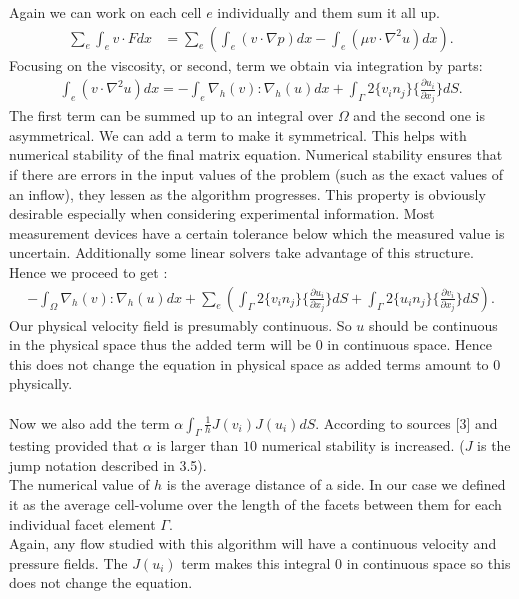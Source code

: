 \documentclass[11pt,twoside,a4paper]{article}
\begin{document}
Again we can work on each cell $e$ individually and them sum it all up.
\begin{align*}
\sum_e \int_e v \cdot F dx &= \sum_e (\int_e (v \cdot \nabla p) dx - \int_e (\mu v \cdot \nabla^2 u) dx) .
\end{align*}
Focusing on the viscosity, or second, term we obtain via integration by parts:
\begin{align*}
\int_e (v \cdot \nabla^2 u) dx = - \int_e \nabla_h(v) : \nabla_h(u) dx + \int_\Gamma 2 \{ v_i n_j \} \{ \frac{\partial u_i}{\partial x_j}\} dS .
\end{align*}
The first term can be summed up to an integral over $\Omega$ and the second one is asymmetrical. We can add a term to make it symmetrical. This helps with numerical stability of the final matrix equation. Numerical stability ensures that if there are errors in the input values of the problem (such as the exact values of an inflow), they lessen as the algorithm progresses. This property is obviously desirable especially when considering experimental information. Most measurement devices have a certain tolerance below which the measured value is uncertain. Additionally some linear solvers take advantage of this structure.\\
Hence we proceed to get :
\begin{align*}
-  \int_\Omega \nabla_h(v) : \nabla_h(u) dx + \sum_e( \int_\Gamma 2 \{ v_i n_j \} \{ \frac{\partial u_i}{\partial x_j}\} dS + \int_\Gamma 2 \{ u_i n_j \} \{ \frac{\partial v_i}{\partial x_j}\} dS) .
\end{align*}
Our physical velocity field is presumably continuous.
So $u$ should be continuous in the physical space thus the added term will be $0$ in continuous space. Hence this does not change the equation in physical space as added terms amount to $0$ physically.\\
\\
Now we also add the term $\alpha \int_\Gamma \frac{1}{h}  J(v_i) J(u_i) dS$. According to sources [3] and testing provided that  $\alpha$ is larger than $10$ numerical stability is increased.
($J$ is the jump notation described in 3.5).\\
The numerical value of $h$ is the average distance of a side. In our case we defined it as the average cell-volume over the length of the facets between them for each individual facet element $\Gamma$.\\
Again, any flow studied with this algorithm will have a continuous velocity and pressure fields. The $J(u_i)$ term makes this integral $0$ in continuous space so this does not change the equation.\\
\end{document}
